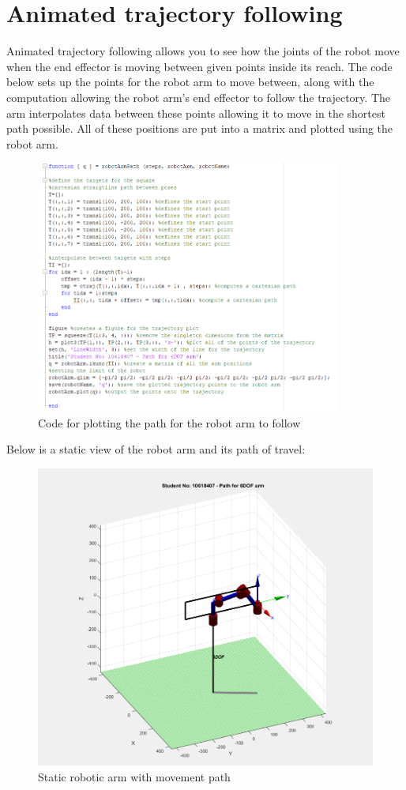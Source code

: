 \documentclass [11pt]{report}
\begin{document}
\section{Animated trajectory following}

Animated trajectory following allows you to see how the joints of the robot move when the end effector is moving between given points inside its reach. The code below sets up the points for the robot arm to move between, along with the computation allowing the robot arm's end effector to follow the trajectory. The arm interpolates data between these points allowing it to move in the shortest path possible. All of these positions are put into a matrix and plotted using the robot arm.

\begin{figure}[H]
\centerline{\includegraphics[width=10cm]{robotArmPathCode.png}}
\caption{Code for plotting the path for the robot arm to follow}
\label{fig}
\end{figure} 

Below is a static view of the robot arm and its path of travel: 

\begin{figure}[H]
\centerline{\includegraphics[width=14cm]{movingRobotArm.png}}
\caption{Static robotic arm with movement path}
\label{fig}
\end{figure} 
\end{document}
